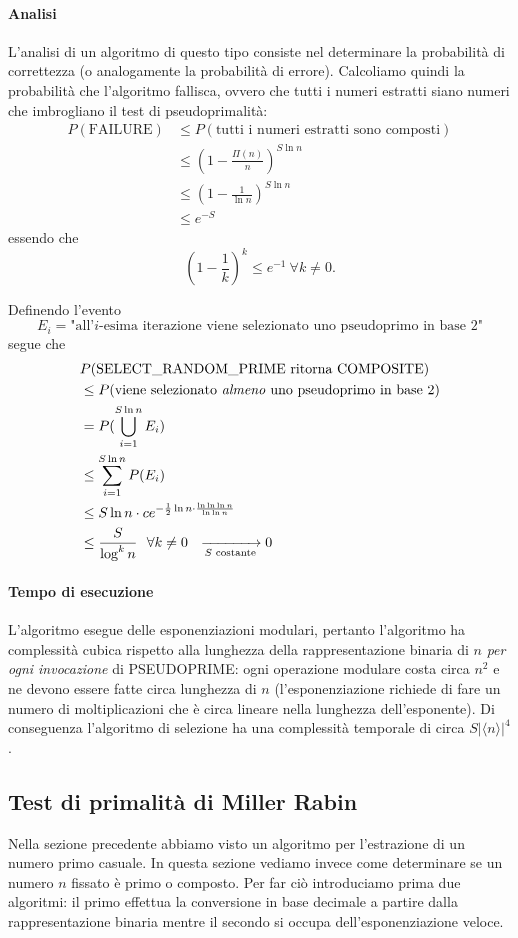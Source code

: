 \paragraph{Analisi} L'analisi di un algoritmo di questo tipo consiste nel determinare la probabilità di correttezza (o analogamente la probabilità di errore). Calcoliamo quindi la probabilità che l'algoritmo fallisca, ovvero che tutti i numeri estratti siano numeri che imbrogliano il test di pseudoprimalità:
\begin{align*}
P(\text{FAILURE})&\leq P(\text{tutti i numeri estratti sono composti}) \\
&\leq \left( 1-\frac{\Pi(n)}{n} \right)^{S\ln n} \\
&\leq \left( 1-\frac{1}{\ln n} \right)^{S\ln n} \\
&\leq e^{-S}
\end{align*}
essendo che
\[
\left( 1-\frac{1}{k} \right)^k \leq e^{-1}\ \forall k\neq 0.
\]

Definendo l'evento
\[
E_i=\text{"all'}i\text{-esima iterazione viene selezionato uno pseudoprimo in base 2"}
\]
segue che 
\begin{align*}
&P(\text{SELECT\_RANDOM\_PRIME ritorna COMPOSITE}) \\
&\leq P(\text{viene selezionato \textit{almeno} uno pseudoprimo in base 2}) \\
&=P(\bigcup_{i=1}^{S\ln n} E_i) \\
&\leq \sum_{i=1}^{S\ln n} P(E_i) \\
&\leq S\ln n\cdot ce^{-\frac{1}{2}\ln n \cdot \frac{\ln\ln\ln n}{\ln\ln n}} \\
&\leq \frac{S}{\log^k n}\ \ \forall k\neq 0 \ \ \xrightarrow[S \text{ costante}]{} 0
\end{align*}

\paragraph{Tempo di esecuzione} L'algoritmo esegue delle esponenziazioni modulari, pertanto l'algoritmo ha complessità cubica rispetto alla lunghezza della rappresentazione binaria di $n$ \textit{per ogni invocazione} di PSEUDOPRIME: ogni operazione modulare costa circa $n^2$ e ne devono essere fatte circa lunghezza di $n$ (l'esponenziazione richiede di fare un numero di moltiplicazioni che è circa lineare nella lunghezza dell'esponente). Di conseguenza l'algoritmo di selezione ha una complessità temporale di circa $S|\langle n \rangle |^4$.

\subsection{Test di primalità di Miller Rabin}
Nella sezione precedente abbiamo visto un algoritmo per l'estrazione di un numero primo casuale. In questa sezione vediamo invece come determinare se un numero $n$ fissato è primo o composto. Per far ciò introduciamo prima due algoritmi: il primo effettua la conversione in base decimale a partire dalla rappresentazione binaria mentre il secondo si occupa dell'esponenziazione veloce.

